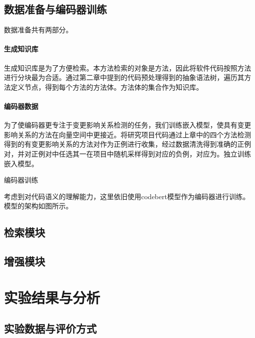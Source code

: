 \subsection{数据准备与编码器训练}

数据准备共有两部分。

\paragraph{生成知识库} 生成知识库是为了方便检索。本方法检索的对象是方法，因此将软件代码按照方法进行分块最为合适。通过第二章中提到的代码预处理得到的抽象语法树，遍历其方法定义节点，得到每个方法的方法体。方法体的集合作为知识库。

\paragraph{编码器数据} 为了使编码器更专注于变更影响关系检测的任务，我们训练嵌入模型，使具有变更影响关系的方法在向量空间中更接近。将研究项目代码通过上章中的四个方法检测得到的有变更影响关系的方法对作为正例进行收集，经过数据清洗得到准确的正例对，并对正例对中任选其一在项目中随机采样得到对应的负例，对应为。独立训练嵌入模型。



编码器训练

考虑到对代码语义的理解能力，这里依旧使用codebert模型作为编码器进行训练。模型的架构如图所示。








\subsection{检索模块}





\subsection{增强模块}




\section{实验结果与分析}

\subsection{实验数据与评价方式}


